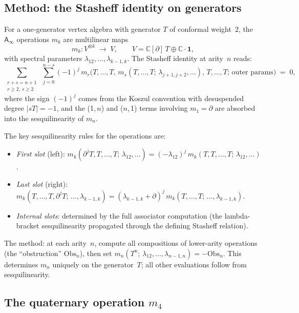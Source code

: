 \documentclass[11pt]{article}
\newcommand{\C}{\mathbb{C}}
\newcommand{\Ainf}{\mathsf{A}_{\infty}}
\begin{document}
\subsection{Method: the Stasheff identity on generators}

For a one-generator vertex algebra with generator $T$ of conformal
weight~$2$, the $\Ainf$ operations $m_k$ are multilinear maps
\[
m_k \colon V^{\otimes k} \;\to\; V,
\qquad
V = \C[\partial]\,T \oplus \C \cdot \mathbf{1},
\]
with spectral parameters
$\lambda_{12}, \ldots, \lambda_{k-1,k}$.
The Stasheff identity at arity~$n$ reads:
\begin{equation}\label{eq:stasheff-arity-n-wn}
\sum_{\substack{r+s = n+1 \\ r \ge 2,\, s \ge 2}}
\;\sum_{j=0}^{n-s}
(-1)^{j}\,
m_r\!\bigl(T, \ldots, T,\,
  m_s(T, \ldots, T;\, \lambda_{j+1,j+2}, \ldots),\,
  T, \ldots, T;\, \text{outer params}\bigr)
\;=\; 0,
\end{equation}
where the sign $(-1)^j$ comes from the Koszul convention
with desuspended degree $|sT| = -1$,
and the (1,\,$n$) and ($n$,\,1) terms involving $m_1 = \partial$
are absorbed into the sesquilinearity of $m_n$.

The key sesquilinearity rules for the operations are:
\begin{itemize}
\item \textit{First slot} (left):
  $m_k(\partial^j T, T, \ldots, T;\, \lambda_{12}, \ldots)
  = (-\lambda_{12})^j\, m_k(T, T, \ldots, T;\, \lambda_{12}, \ldots)$.
\item \textit{Last slot} (right):
  $m_k(T, \ldots, T, \partial^j T;\, \ldots, \lambda_{k-1,k})
  = (\lambda_{k-1,k} + \partial)^j\, m_k(T, \ldots, T;\, \ldots, \lambda_{k-1,k})$.
\item \textit{Internal slots}: determined by the full associator
  computation (the lambda-bracket sesquilinearity propagated
  through the defining Stasheff relation).
\end{itemize}

The method: at each arity~$n$, compute all compositions of
lower-arity operations (the ``obstruction'' $\mathrm{Obs}_n$),
then set $m_n(T^n;\, \lambda_{12}, \ldots, \lambda_{n-1,n})
= -\mathrm{Obs}_n$.  This determines $m_n$ uniquely on the
generator~$T$; all other evaluations follow from sesquilinearity.

\subsection{The quaternary operation $m_4$}
\end{document}
